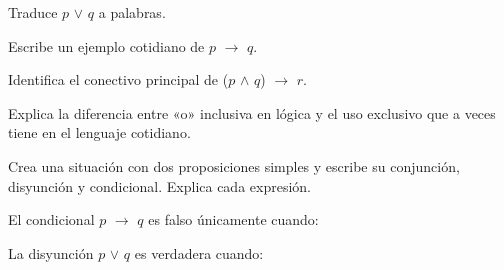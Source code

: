 \begin{activity}[id=dia-04-corta-04,type=short,weight=1]

Traduce \(p\) \(\lor\) \(q\) a palabras.

\end{activity}

\begin{activity}[id=dia-04-corta-05,type=short,weight=1]

Escribe un ejemplo cotidiano de \(p\) \(\to\) \(q\).

\end{activity}

\begin{activity}[id=dia-04-corta-06,type=short,weight=1]

Identifica el conectivo principal de (\(p\) \(\land\) \(q\)) \(\to\) \(r\).

\end{activity}

\begin{activity}[id=dia-04-desarrollo-01,type=long,weight=2]

Explica la diferencia entre «o» inclusiva en lógica y el uso exclusivo que a veces tiene en el lenguaje cotidiano.

\end{activity}

\begin{activity}[id=dia-04-desarrollo-02,type=long,weight=2]

Crea una situación con dos proposiciones simples y escribe su conjunción, disyunción y condicional. Explica cada expresión.

\end{activity}

\begin{activity}[id=dia-04-opcion-01,type=choice,weight=1]

El condicional \(p\) \(\to\) \(q\) es falso únicamente cuando:





\end{activity}

\begin{activity}[id=dia-04-opcion-02,type=choice,weight=1]

La disyunción \(p\) \(\lor\) \(q\) es verdadera cuando:





\end{activity}

